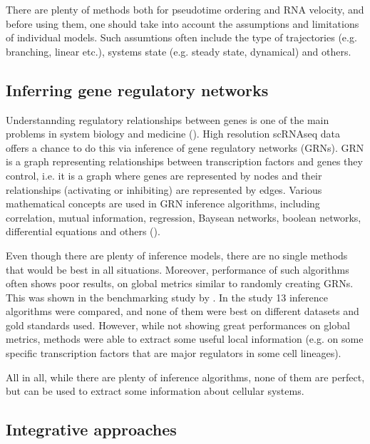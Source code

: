 There are plenty of methods both for pseudotime ordering and RNA velocity, and before using them,
one should take into account the assumptions and limitations of individual models.
Such assumtions often include the type of trajectories (e.g. branching, linear etc.), systems state (e.g. steady state, dynamical) and others.

\subsection{Inferring gene regulatory networks}

Understannding regulatory relationships between genes is one of the main problems in system biology and medicine (\cite{Lamoline2024}).
High resolution scRNAseq data offers a chance to do this via inference of gene regulatory networks (GRNs).
GRN is a graph representing relationships between transcription factors and genes they control,
i.e. it is a graph where genes are represented by nodes and their relationships (activating or inhibiting) are represented by edges.
Various mathematical concepts are used in GRN inference algorithms, including
correlation, mutual information, regression, Baysean networks, boolean networks, differential equations and others (\cite{Akers2021}).

Even though there are plenty of inference models, there are no single methods that would be best in all situations.
Moreover, performance of such algorithms often shows poor results, on global metrics similar to randomly creating GRNs.
This was shown in the benchmarking study by \textcite{McCalla2023}.
In the study 13 inference algorithms were compared, and none of them were best on different datasets and gold standards used.
However, while not showing great performances on global metrics, methods were able to extract some useful local information
(e.g. on some specific transcription factors that are major regulators in some cell lineages).

All in all, while there are plenty of inference algorithms, none of them are perfect,
but can be used to extract some information about cellular systems.

\subsection{Integrative approaches}

